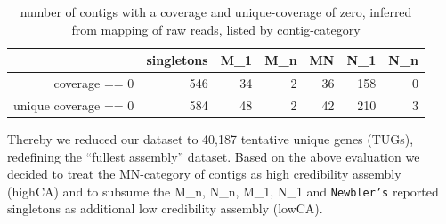 \documentclass[12pt,a4paper]{article}
\begin{document}
\begin{table}[ht]
\begin{center}
\begin{tabular}{rrrrrrr}
  \hline
 & singletons & M\_1 & M\_n & MN & N\_1 & N\_n \\ 
  \hline
coverage == 0 & 546 &  34 &   2 &  36 & 158 &   0 \\ 
  unique coverage == 0 & 584 &  48 &   2 &  42 & 210 &   3 \\ 
   \hline
\end{tabular}
\caption{number of contigs with a coverage and unique-coverage of zero, inferred from mapping of raw reads, listed by contig-category}
\label{tab:cov.ex}
\end{center}
\end{table}
Thereby we reduced our dataset to 40,187 tentative unique genes
(TUGs), redefining the ``fullest assembly'' dataset. Based on the
above evaluation we decided to treat the MN-category of contigs as
high credibility assembly (highCA) and to subsume the M\_n, N\_n,
M\_1, N\_1 and \texttt{Newbler's} reported singletons as additional
low credibility assembly (lowCA).




\newpage
\end{document}
